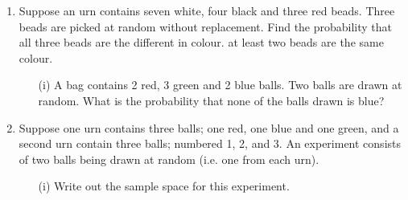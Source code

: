 \documentclass[]{report}
\begin{document}
	
\begin{enumerate}	
\item Suppose an urn contains seven white, four black and three red beads. Three beads are picked at random without replacement.
	Find the probability that all three beads are the different in colour.
	at least two beads are the same colour.
	\begin{itemize}	
		\item[(i)] A bag contains 2 red, 3 green and 2 blue balls. Two balls are drawn at random. What is the probability that none of the balls drawn is blue?
		
	\end{itemize}
\item 
	Suppose one urn contains three balls; one red, one blue and one green, and a second urn contain three balls; numbered 1, 2, and 3. An experiment consists of two balls being drawn at random (i.e. one from each urn).
	
	\begin{itemize}
		\item[(i)]  Write out the sample space for this experiment.
	\end{itemize}
\end{enumerate}
\end{document}

